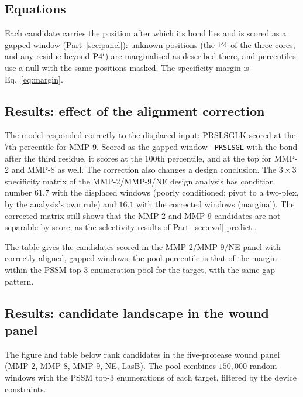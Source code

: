 \subsection{Equations}

Each candidate carries the position after which its bond lies and is scored as a
gapped window (Part~\ref{sec:panel}): unknown positions (the $\mathrm{P}4$ of the
three cores, and any residue beyond $\mathrm{P}4'$) are marginalised as described
there, and percentiles use a null with the same positions masked. The
specificity margin is Eq.~\eqref{eq:margin}.

\subsection{Results: effect of the alignment correction}

The model responded correctly to the displaced input: PRSLSGLK scored at the
$7$th percentile for MMP-9. Scored as the gapped window \texttt{-PRSLSGL} with
the bond after the third residue, it scores at the $100$th percentile, and at
the top for MMP-2 and MMP-8 as well. The correction also changes a design
conclusion. The $3\times3$ specificity matrix of the MMP-2/MMP-9/NE design
analysis has condition number $61.7$ with the displaced windows (poorly
conditioned; pivot to a two-plex, by the analysis's own rule) and $16.1$ with
the corrected windows (marginal). The corrected matrix still shows that the
MMP-2 and MMP-9 candidates are not separable by score, as the selectivity
results of Part~\ref{sec:eval} predict \CONF.

\begin{center}
\small\renewcommand{\arraystretch}{1.25}

\end{center}

The table gives the candidates scored in the MMP-2/MMP-9/NE panel with correctly
aligned, gapped windows; the pool percentile is that of the margin within the
PSSM top-3 enumeration pool for the target, with the same gap pattern.

\subsection{Results: candidate landscape in the wound panel}

The figure and table below rank candidates in the five-protease wound panel
(MMP-2, MMP-8, MMP-9, NE, LasB). The pool combines $150{,}000$ random windows with
the PSSM top-3 enumerations of each target, filtered by the device constraints.

